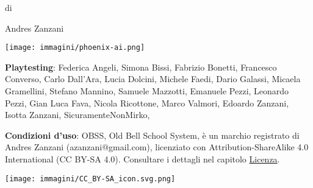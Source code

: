 \begin{center}di \end{center}

{\LARGE \begin{center} Andres Zanzani \end{center}}

\vspace{2cm}

\begin{center}
\texttt{[image: immagini/phoenix-ai.png]}
\end{center}

\vfill

\begin{mdframed}[roundcorner=10pt]

\medskip

\thispagestyle{empty}

\textbf{Playtesting}: Federica Angeli, Simona Bissi, Fabrizio Bonetti, Francesco Converso, Carlo Dall'Ara, Lucia Dolcini, Michele Faedi, Dario Galassi, Micaela Gramellini, Stefano Mannino, Samuele Mazzotti, Emanuele Pezzi, Leonardo Pezzi, Gian Luca Fava, Nicola Ricottone, Marco Valmori, Edoardo Zanzani, Isotta Zanzani, SicuramenteNonMirko,

\bigskip

\begin{flushleft}\textbf{Condizioni d'uso}: OBSS, Old Bell School System, è un marchio registrato di Andres Zanzani (azanzani@gmail.com), licenziato con Attribution-ShareAlike 4.0 International (CC BY-SA 4.0). Consultare i dettagli nel capitolo \hyperlink{Licenza}{Licenza}.
\end{flushleft}

\vspace{0.5cm}

\begin{center}
\texttt{[image: immagini/CC\_BY-SA\_icon.svg.png]}
\end{center}

\medskip

\end{mdframed}


\pagebreak ~

\thispagestyle{empty}

\pagebreak ~

\setcounter{page}{1}


